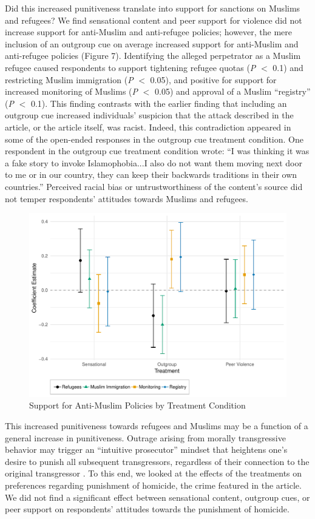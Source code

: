 \documentclass[12pt, letterpaper]{article}
\begin{document}
Did this increased punitiveness translate into support for sanctions on Muslims and refugees? We find sensational content and peer support for violence did not increase support for anti-Muslim and anti-refugee policies; however, the mere inclusion of an outgroup cue on average increased support for anti-Muslim and anti-refugee policies (Figure 7). Identifying the alleged perpetrator as a Muslim refugee caused respondents to support tightening refugee quotas (\textit{P} $<$ 0.1) and restricting Muslim immigration  (\textit{P} $<$ 0.05), and positive for support for increased monitoring of Muslims  (\textit{P} $<$ 0.05) and approval of a Muslim ``registry'' (\textit{P} $<$ 0.1). This finding contrasts with the earlier finding that including an outgroup cue increased individuals' suspicion that the attack described in the article, or the article itself, was racist. Indeed, this contradiction appeared in some of the open-ended responses in the outgroup cue treatment condition. One respondent in the outgroup cue treatment condition wrote: ``I was thinking it was a fake story to invoke Islamophobia...I also do not want them moving next door to me or in our country, they can keep their backwards traditions in their own countries.'' Perceived racial bias or untrustworthiness of the content's source did not temper respondents' attitudes towards Muslims and refugees.

\begin{figure}[!htbp]
  \centering
  \caption{Support for Anti-Muslim Policies by Treatment Condition}
  \includegraphics[width=.835\textwidth]{figures/ATE_punitive.pdf}
\end{figure}

This increased punitiveness towards refugees and Muslims may be a function of a general increase in punitiveness. Outrage arising from morally transgressive behavior may trigger an ``intuitive prosecutor'' mindset that heightens one's desire to punish all subsequent transgressors, regardless of their connection to the original transgressor \citep{crockett2017moral, goldberg1999rage, tetlock2007}. To this end, we looked at the effects of the treatments on preferences regarding punishment of homicide, the crime featured in the article. We did not find a significant effect between sensational content, outgroup cues, or peer support on respondents' attitudes towards the punishment of homicide. 
\end{document}

